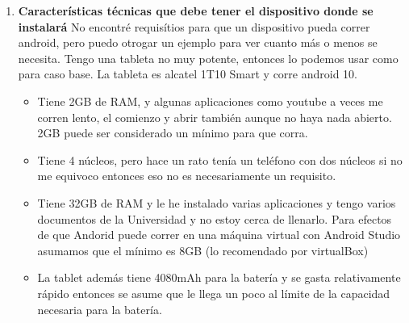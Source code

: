 \documentclass[stu, 12pt, letterpaper, donotrepeattitle, floatsintext, natbib, helv]{apa7}
\begin{document}
\begin{enumerate}
    
    \item \textbf{Características técnicas que debe tener el dispositivo donde se instalará}
    No encontré requisítios para que un dispositivo pueda correr android, pero puedo otrogar un ejemplo para ver cuanto más o menos se necesita. Tengo una tableta no muy potente, entonces lo podemos usar como para caso base. La tableta es alcatel 1T10 Smart y corre android 10.
    \begin{itemize}
        \item Tiene 2GB de RAM, y algunas aplicaciones como youtube a veces me corren lento, el comienzo y abrir también aunque no haya nada abierto. 2GB puede ser considerado un mínimo para que corra.
        \item Tiene 4 núcleos, pero hace un rato tenía un teléfono con dos núcleos si no me equivoco entonces eso no es necesariamente un requisito.
        \item Tiene 32GB de RAM y le he instalado varias aplicaciones y tengo varios documentos de la Universidad y no estoy cerca de llenarlo. Para efectos de que Andorid puede correr en una máquina virtual con Android Studio asumamos que el mínimo es 8GB (lo recomendado por virtualBox)
        \item La tablet además tiene 4080mAh para la batería y se gasta relativamente rápido entonces se asume que le llega un poco al límite de la capacidad necesaria para la batería.
    \end{itemize}
    

\end{enumerate}
\end{document}
